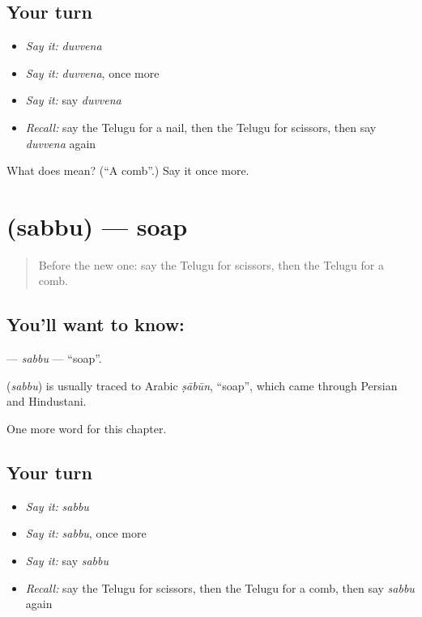\subsection*{Your turn}
\begin{itemize}
\raggedright
  \item \emph{Say it:} \emph{duvvena}
  \item \emph{Say it:} \emph{duvvena}, once more
  \item \emph{Say it:} say \emph{duvvena}
  \item \emph{Recall:} say the Telugu for a nail, then the Telugu for scissors, then say \emph{duvvena} again
\end{itemize}

\begin{tcolorbox}[breakable,colback=teal!4,colframe=teal!35!black,title={Before you move on}]
What does  mean? (\textquotedblleft{}A comb\textquotedblright{}.) Say it once more.
\end{tcolorbox}
\section[\texorpdfstring{\te{సబ్బు} (sabbu)}{సబ్బు (sabbu)}]{ (sabbu) — soap}

\label{lesson:TE-C111-sabbu}



\begin{quote}
Before the new one: say the Telugu for scissors, then the Telugu for a comb.
\end{quote}

\subsection*{You'll want to know: }
\textbf{} — \emph{sabbu} — \textquotedblleft{}soap\textquotedblright{}.

\begin{cousinweb}
\textbf{} (\emph{sabbu}) is usually traced to Arabic \emph{ṣābūn}, \textquotedblleft{}soap\textquotedblright{}, which came through Persian and Hindustani.
\end{cousinweb}

\begin{grammarlens}[title={What you've built}]
One more word for this chapter.
\end{grammarlens}

\subsection*{Your turn}
\begin{itemize}
\raggedright
  \item \emph{Say it:} \emph{sabbu}
  \item \emph{Say it:} \emph{sabbu}, once more
  \item \emph{Say it:} say \emph{sabbu}
  \item \emph{Recall:} say the Telugu for scissors, then the Telugu for a comb, then say \emph{sabbu} again
\end{itemize}

